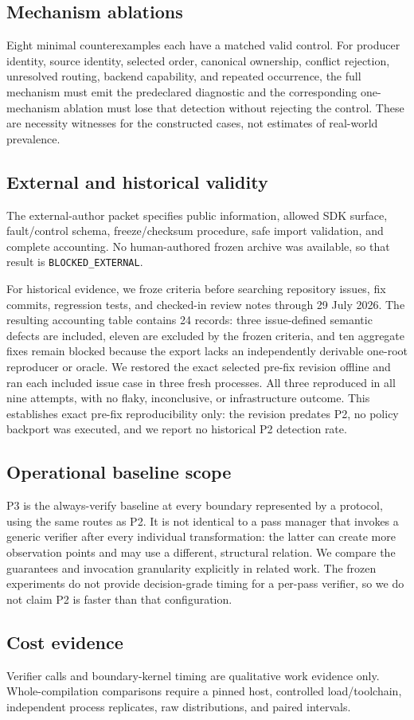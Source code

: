 \subsection{Mechanism ablations}
Eight minimal counterexamples each have a matched valid control. For producer identity, source identity, selected order, canonical ownership, conflict rejection, unresolved routing, backend capability, and repeated occurrence, the full mechanism must emit the predeclared diagnostic and the corresponding one-mechanism ablation must lose that detection without rejecting the control. These are necessity witnesses for the constructed cases, not estimates of real-world prevalence.

\subsection{External and historical validity}
The external-author packet specifies public information, allowed SDK surface, fault/control schema, freeze/checksum procedure, safe import validation, and complete accounting. No human-authored frozen archive was available, so that result is \texttt{BLOCKED\_EXTERNAL}.

For historical evidence, we froze criteria before searching repository issues, fix commits, regression tests, and checked-in review notes through 29 July 2026. The resulting accounting table contains 24 records: three issue-defined semantic defects are included, eleven are excluded by the frozen criteria, and ten aggregate fixes remain blocked because the export lacks an independently derivable one-root reproducer or oracle. We restored the exact selected pre-fix revision offline and ran each included issue case in three fresh processes. All three reproduced in all nine attempts, with no flaky, inconclusive, or infrastructure outcome. This establishes exact pre-fix reproducibility only: the revision predates P2, no policy backport was executed, and we report no historical P2 detection rate.

\subsection{Operational baseline scope}
P3 is the always-verify baseline at every boundary represented by a protocol, using the same routes as P2. It is not identical to a pass manager that invokes a generic verifier after every individual transformation: the latter can create more observation points and may use a different, structural relation. We compare the guarantees and invocation granularity explicitly in related work. The frozen experiments do not provide decision-grade timing for a per-pass verifier, so we do not claim P2 is faster than that configuration.

\subsection{Cost evidence}
Verifier calls and boundary-kernel timing are qualitative work evidence only. Whole-compilation comparisons require a pinned host, controlled load/toolchain, independent process replicates, raw distributions, and paired intervals.
